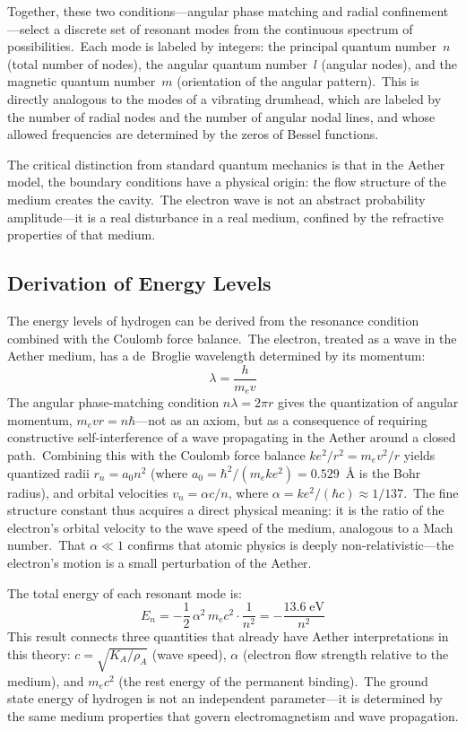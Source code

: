 ﻿\documentclass[12pt,letterpaper]{article}
\newcommand{\rhoa}{\rho_{\!A}}
\newcommand{\Ka}{K_{\!A}}
\begin{document}
Together, these two conditions---angular phase matching and radial confinement---select
a discrete set of resonant modes from the continuous spectrum of possibilities.\ Each mode
is labeled by integers: the principal quantum number~$n$ (total number of nodes), the
angular quantum number~$l$ (angular nodes), and the magnetic quantum number~$m$ (orientation
of the angular pattern).\ This is directly analogous to the modes of a vibrating drumhead,
which are labeled by the number of radial nodes and the number of angular nodal lines, and
whose allowed frequencies are determined by the zeros of Bessel functions.

The critical distinction from standard quantum mechanics is that in the Aether model, the
boundary conditions have a physical origin: the flow structure of the medium creates the
cavity.\ The electron wave is not an abstract probability amplitude---it is a real
disturbance in a real medium, confined by the refractive properties of that medium.

\subsection{Derivation of Energy Levels}

The energy levels of hydrogen can be derived from the resonance condition combined with the
Coulomb force balance.\ The electron, treated as a wave in the Aether medium, has a
de~Broglie wavelength determined by its momentum:
%
\begin{equation}
  \lambda = \frac{h}{m_e v}
\end{equation}
%
The angular phase-matching condition $n\lambda = 2\pi r$ gives the
quantization of angular momentum, $m_e v r = n\hbar$---not as an axiom,
but as a consequence of requiring constructive self-interference of a wave
propagating in the Aether around a closed path.\ Combining this with the
Coulomb force balance $ke^2/r^2 = m_e v^2/r$ yields quantized radii
$r_n = a_0 n^2$ (where $a_0 = \hbar^2/(m_e k e^2) = 0.529$~\AA{} is the
Bohr radius), and orbital velocities $v_n = \alpha c / n$, where
$\alpha = ke^2/(\hbar c) \approx 1/137$.\ The fine structure constant thus
acquires a direct physical meaning: it is the ratio of the electron's
orbital velocity to the wave speed of the medium, analogous to a Mach
number.\ That $\alpha \ll 1$ confirms that atomic physics is deeply
non-relativistic---the electron's motion is a small perturbation of the
Aether.

The total energy of each resonant mode is:
%
\begin{equation}
  E_n = -\frac{1}{2}\,\alpha^2\,m_e c^2 \cdot \frac{1}{n^2}
  = -\frac{13.6\;\mathrm{eV}}{n^2}
\end{equation}
%
This result connects three quantities that already have Aether interpretations in this
theory: $c = \sqrt{\Ka/\rhoa}$ (wave speed), $\alpha$ (electron flow strength relative to
the medium), and $m_e c^2$ (the rest energy of the permanent binding).\ The ground state
energy of hydrogen is not an independent parameter---it is determined by the same medium
properties that govern electromagnetism and wave propagation.
\end{document}
